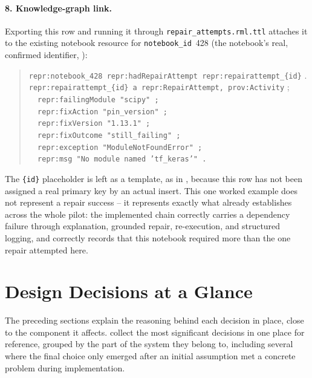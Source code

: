 \paragraph{8. Knowledge-graph link.} Exporting this row and running it
through \texttt{repair\_attempts.\allowbreak rml.ttl} attaches it to the existing
notebook resource for \texttt{notebook\_id}~428 (the notebook's real,
confirmed identifier, ):

\begin{quote}
\small
\texttt{repr:notebook\_428 repr:hadRepairAttempt repr:repairattempt\_\{id\}} .\\[2pt]
\texttt{repr:repairattempt\_\{id\} a repr:RepairAttempt, prov:Activity} ;\\
\texttt{\ \ repr:failingModule "scipy" ;}\\
\texttt{\ \ repr:fixAction "pin\_version" ;}\\
\texttt{\ \ repr:fixVersion "1.13.1" ;}\\
\texttt{\ \ repr:fixOutcome "still\_failing" ;}\\
\texttt{\ \ repr:exception "ModuleNotFoundError" ;}\\
\texttt{\ \ repr:msg "No module named 'tf\_keras'" .}
\end{quote}

The \texttt{\{id\}} placeholder is left as a template, as in
, because this row has not been assigned a real
primary key by an actual insert. This one worked example does not represent
a repair success -- it represents exactly what 
already establishes across the whole pilot: the implemented chain correctly
carries a dependency failure through explanation, grounded repair,
re-execution, and structured logging, and correctly records that this
notebook required more than the one repair attempted here.

\section{Design Decisions at a Glance}
\label{sec:m-decisions}

The preceding sections explain the reasoning behind each decision in place,
close to the component it affects. 
collect the most significant decisions in one place for reference, grouped
by the part of the system they belong to, including several where the final
choice only emerged after an initial assumption met a concrete problem
during implementation.

